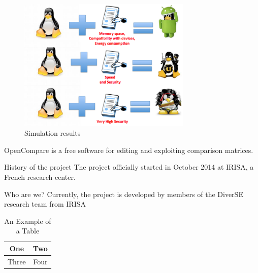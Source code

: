 \documentclass[10pt, conference, compsocconf]{IEEEtran}
\begin{document}
%
\begin{figure}[!t]
\centering
\includegraphics[width=3.25in]{tux.png}%
\caption{Simulation results}
\label{fig_sim}
\vspace*{-4mm}
\end{figure}


%

OpenCompare is a free software for editing and exploiting comparison matrices.

History of the project
The project officially started in October 2014 at IRISA, a French research center.

Who are we?
Currently, the project is developed by members of the DiverSE research team from IRISA





%
\begin{table}[!t]
\caption{An Example of a Table}
\label{table_example}
\centering
\begin{tabular}{|c||c|}
\hline
One & Two\\
\hline
Three & Four\\
\hline
\end{tabular}
\end{table}
\end{document}
